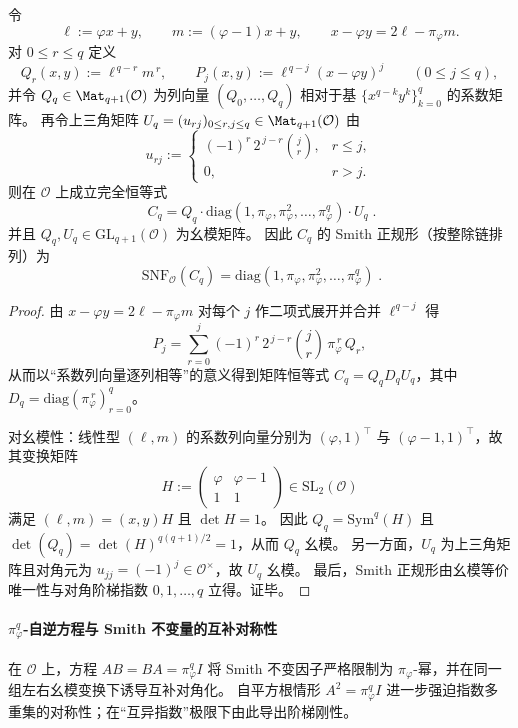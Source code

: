 \begin{conclusion}\label{con:xi-symq-golden-cq-smith-staircase}
令
\[
\ell:=\varphi x+y,\qquad m:=(\varphi-1)x+y,
\qquad
x-\varphi y=2\ell-\pi_\varphi m.
\]
对 \(0\le r\le q\) 定义
\[
Q_r(x,y):=\ell^{\,q-r}m^{\,r},
\qquad
P_j(x,y):=\ell^{\,q-j}(x-\varphi y)^{j}\qquad(0\le j\le q),
\]
并令 \(Q_q\in\Mat_{q+1}(\mathcal O)\) 为列向量 \((Q_0,\dots,Q_q)\) 相对于基 \(\{x^{q-k}y^k\}_{k=0}^{q}\) 的系数矩阵。
再令上三角矩阵 \(U_q=(u_{rj})_{0\le r,j\le q}\in\Mat_{q+1}(\mathcal O)\) 由
\[
u_{rj}:=
\begin{cases}
(-1)^r\,2^{\,j-r}\binom{j}{r},& r\le j,\\
0,& r>j.
\end{cases}
\]
则在 \(\mathcal O\) 上成立完全恒等式
\[
\boxed{\;
C_q
=
Q_q\cdot \mathrm{diag}(1,\pi_\varphi,\pi_\varphi^2,\dots,\pi_\varphi^{q})\cdot U_q\; }.
\]
并且 \(Q_q,U_q\in \mathrm{GL}_{q+1}(\mathcal O)\) 为幺模矩阵。
因此 \(C_q\) 的 Smith 正规形（按整除链排列）为
\[
\boxed{\;
\mathrm{SNF}_{\mathcal O}(C_q)=\mathrm{diag}(1,\pi_\varphi,\pi_\varphi^2,\dots,\pi_\varphi^{q})\; }.
\]
\end{conclusion}
\begin{proof}
由
\(
x-\varphi y=2\ell-\pi_\varphi m
\)
对每个 \(j\) 作二项式展开并合并 \(\ell^{q-j}\) 得
\[
P_j=\sum_{r=0}^{j}(-1)^r\,2^{\,j-r}\binom{j}{r}\,\pi_\varphi^{\,r}\,Q_r,
\]
从而以“系数列向量逐列相等”的意义得到矩阵恒等式
\(
C_q=Q_qD_qU_q
\)，其中 \(D_q=\mathrm{diag}(\pi_\varphi^{\,r})_{r=0}^{q}\)。
\par
对幺模性：线性型 \((\ell,m)\) 的系数列向量分别为 \((\varphi,1)^{\top}\) 与 \((\varphi-1,1)^{\top}\)，故其变换矩阵
\[
H:=
\begin{pmatrix}\varphi&\varphi-1\\[2pt]1&1\end{pmatrix}\in\mathrm{SL}_2(\mathcal O)
\]
满足 \((\ell,m)=(x,y)H\) 且 \(\det H=1\)。
因此 \(Q_q=\mathrm{Sym}^q(H)\) 且
\(
\det(Q_q)=\det(H)^{q(q+1)/2}=1
\)，从而 \(Q_q\) 幺模。
另一方面，\(U_q\) 为上三角矩阵且对角元为 \(u_{jj}=(-1)^j\in\mathcal O^{\times}\)，故 \(U_q\) 幺模。
最后，Smith 正规形由幺模等价唯一性与对角阶梯指数 \(0,1,\dots,q\) 立得。证毕。
\end{proof}

\paragraph{\texorpdfstring{$\pi_\varphi^q$}{pi^q}-自逆方程与 Smith 不变量的互补对称性}
在 \(\mathcal O\) 上，方程 \(AB=BA=\pi_\varphi^q I\) 将 Smith 不变因子严格限制为 \(\pi_\varphi\)-幂，并在同一组左右幺模变换下诱导互补对角化。
自平方根情形 \(A^2=\pi_\varphi^q I\) 进一步强迫指数多重集的对称性；在“互异指数”极限下由此导出阶梯刚性。

